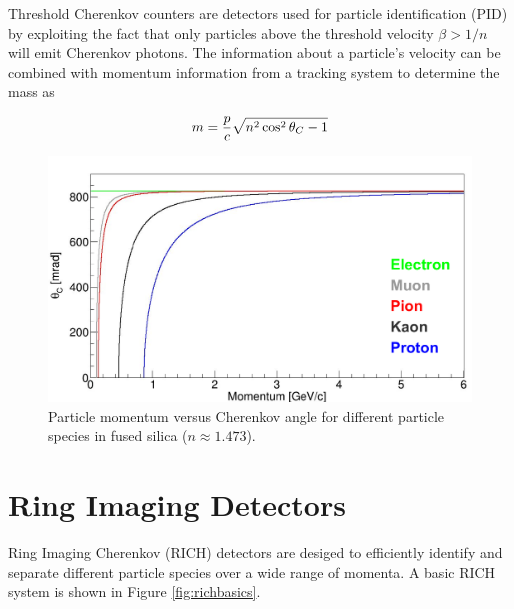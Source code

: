 Threshold Cherenkov counters are detectors used for particle identification (PID) by exploiting the fact that only particles above the threshold velocity $\beta > 1/n$ will emit Cherenkov photons. The information about a particle's velocity can be combined with momentum information from a tracking system to determine the mass as \cite{ParticleDetectionHandbook}

\begin{equation}
	m = \frac{p}{c} \sqrt{n^2 \cos^2\theta_{C} - 1}
	\label{eq:mass}
\end{equation}

\begin{figure}[ht]
	\centering
	\includegraphics[scale=.8]{figures/angle_seperation_6.pdf}
	\caption{Particle momentum versus Cherenkov angle for different particle species in fused silica ($n \approx 1.473$).}
	\label{fig:angleseperation}
\end{figure}

\section{Ring Imaging Detectors}
Ring Imaging Cherenkov (RICH) detectors are desiged to efficiently identify and separate different particle species over a wide range of momenta. A basic RICH system is shown in Figure \ref{fig:richbasics}. 

